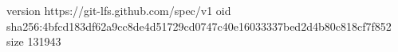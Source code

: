 version https://git-lfs.github.com/spec/v1
oid sha256:4bfcd183df62a9cc8de4d51729cd0747c40e16033337bed2d4b80c818cf7f852
size 131943
